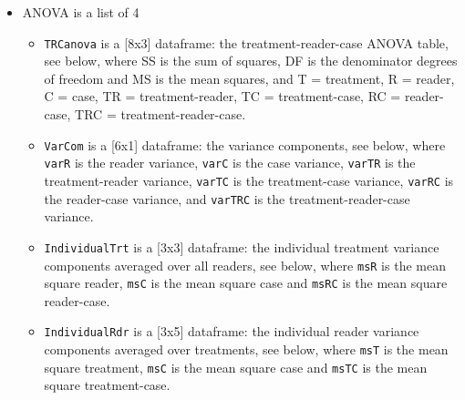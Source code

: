 \documentclass[
]{book}
\providecommand{\tightlist}{%
  \setlength{\itemsep}{0pt}\setlength{\parskip}{0pt}}
\begin{document}
\begin{itemize}
\tightlist
\item
  ANOVA is a list of 4

  \begin{itemize}
  \tightlist
  \item
    \texttt{TRCanova} is a {[}8x3{]} dataframe: the treatment-reader-case ANOVA table, see below, where SS is the sum of squares, DF is the denominator degrees of freedom and MS is the mean squares, and T = treatment, R = reader, C = case, TR = treatment-reader, TC = treatment-case, RC = reader-case, TRC = treatment-reader-case.\\
  \item
    \texttt{VarCom} is a {[}6x1{]} dataframe: the variance components, see below, where \texttt{varR} is the reader variance, \texttt{varC} is the case variance, \texttt{varTR} is the treatment-reader variance, \texttt{varTC} is the treatment-case variance, \texttt{varRC} is the reader-case variance, and \texttt{varTRC} is the treatment-reader-case variance.
  \item
    \texttt{IndividualTrt} is a {[}3x3{]} dataframe: the individual treatment variance components averaged over all readers, see below, where \texttt{msR} is the mean square reader, \texttt{msC} is the mean square case and \texttt{msRC} is the mean square reader-case.
  \item
    \texttt{IndividualRdr} is a {[}3x5{]} dataframe: the individual reader variance components averaged over treatments, see below, where \texttt{msT} is the mean square treatment, \texttt{msC} is the mean square case and \texttt{msTC} is the mean square treatment-case.
  \end{itemize}
\end{itemize}
\end{document}
